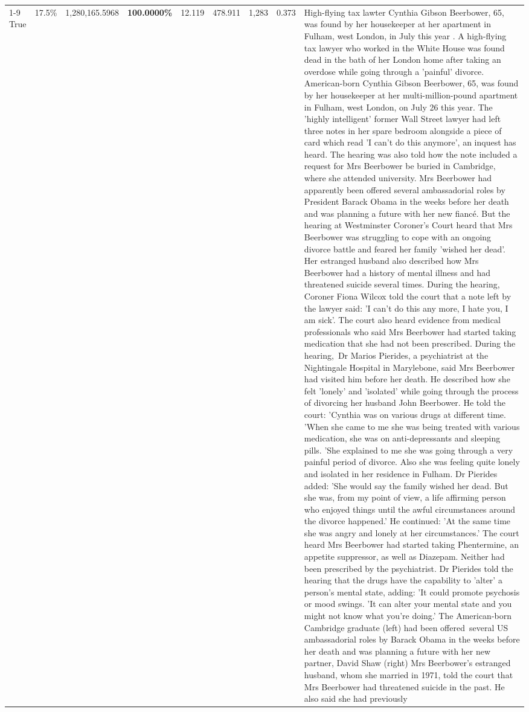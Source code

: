 \begin{table}[H]
\begin{tabular}{lllrlllll}
\cline{1-9}
True & 17.5\% & 1,280,165.5968 & \bfseries \color{red} 100.0000\% & 12.119 & 478.911 & 1,283 & 0.373 & High-flying tax lawter Cynthia Gibson Beerbower, 65, was found by her housekeeper at her apartment in Fulham, west London, in July this year . A high-flying tax lawyer who worked in the White House was found dead in the bath of her London home after taking an overdose while going through a 'painful' divorce. American-born Cynthia Gibson Beerbower, 65, was found by her housekeeper at her multi-million-pound apartment in Fulham, west London, on July 26 this year. The 'highly intelligent' former Wall Street lawyer had left three notes in her spare bedroom alongside a piece of card which read 'I can't do this anymore', an inquest has heard. The hearing was also told how the note included a request for Mrs Beerbower be buried in Cambridge, where she attended university. Mrs Beerbower had apparently been offered several ambassadorial roles by President Barack Obama in the weeks before her death and was planning a future with her new fiancé. But the hearing at Westminster Coroner's Court heard that Mrs Beerbower was struggling to cope with an ongoing divorce battle and feared her family 'wished her dead'. Her estranged husband also described how Mrs Beerbower had a history of mental illness and had threatened suicide several times. During the hearing, Coroner Fiona Wilcox told the court that a note left by the lawyer said: 'I can't do this any more, I hate you, I am sick'. The court also heard evidence from medical professionals who said Mrs Beerbower had started taking medication that she had not been prescribed. During the hearing, Dr Marios Pierides, a psychiatrist at the Nightingale Hospital in Marylebone, said Mrs Beerbower had visited him before her death. He described how she felt 'lonely' and 'isolated' while going through the process of divorcing her husband John Beerbower. He told the court: 'Cynthia was on various drugs at different time. 'When she came to me she was being treated with various medication, she was on anti-depressants and sleeping pills. 'She explained to me she was going through a very painful period of divorce. Also she was feeling quite lonely and isolated in her residence in Fulham. Dr Pierides added: 'She would say the family wished her dead. But she was, from my point of view, a life affirming person who enjoyed things until the awful circumstances around the divorce happened.' He continued: 'At the same time she was angry and lonely at her circumstances.' The court heard Mrs Beerbower had started taking Phentermine, an appetite suppressor, as well as Diazepam. Neither had been prescribed by the psychiatrist. Dr Pierides told the hearing that the drugs have the capability to 'alter' a person's mental state, adding: 'It could promote psychosis or mood swings. 'It can alter your mental state and you might not know what you're doing.' The American-born Cambridge graduate (left) had been offered several US ambassadorial roles by Barack Obama in the weeks before her death and was planning a future with her new partner, David Shaw (right) Mrs Beerbower's estranged husband, whom she married in 1971, told the court that Mrs Beerbower had threatened suicide in the past. He also said she had previously 
\end{tabular}
\end{table}
